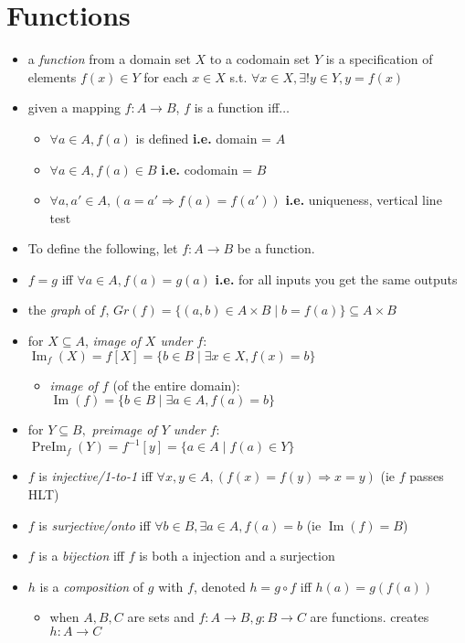 \documentclass[11pt]{article}
\theoremstyle{definition}
\newcommand{\addsection}[1]{\addcontentsline{toc}{section}{#1}\section*{#1}}
\DeclareMathOperator{\Img}{Im}
\DeclareMathOperator{\PreIm}{PreIm}
\begin{document}
\newpage
\addsection{Functions}
\begin{itemize}
    \item a \emph{function} from a domain set $X$ to a codomain set $Y$ is a specification of elements $f(x)\in Y$ for each $x\in X$ s.t. $\forall x\in X, \exists ! y\in Y, y= f(x)$
    \item given a mapping $f : A \rightarrow B$, $f$ is a function iff$\dots$
    \begin{itemize}
        \item $\forall a\in A, f(a)$ is defined \textbf{i.e.} domain = $A$
        \item $\forall a\in A, f(a) \in B$ \textbf{i.e.} codomain = $B$
        \item $\forall a, a' \in A, (a=a' \Rightarrow f(a)=f(a'))$ \textbf{i.e.} uniqueness, vertical line test
    \end{itemize}
    \item To define the following, let $f:A\rightarrow B$ be a function.
    \item $f=g$ iff $\forall a\in A, f(a) = g(a)$ \textbf{i.e.} for all inputs you get the same outputs
    \item the \emph{graph} of $f$, $Gr(f) = \{(a,b)\in A\times B\mid b = f(a)\} \subseteq A\times B$
    \item for $X\subseteq A$, \emph{image of $X$ under $f$}: $\Img_f(X) = f[X] = \{b\in B\mid \exists x\in X, f(x) = b\}$ 
    \begin{itemize}
        \item \emph{image of $f$} (of the entire domain): $\Img(f) = \{b\in B\mid\exists a\in A,f(a)=b\}$
    \end{itemize}
    \item for $Y\subseteq B,$ \emph{preimage of $Y$ under $f$}: $\PreIm_f(Y) = f^{-1}[y] = \{a\in A\mid f(a)\in Y\}$
    \item $f$ is \emph{injective/1-to-1} iff $\forall x,y\in A,(f(x) = f(y) \Rightarrow x=y)$ (ie $f$ passes HLT)
    \item $f$ is \emph{surjective/onto} iff $\forall b\in B, \exists a\in A, f(a)=b$ (ie $\Img(f)=B$)
    \item $f$ is a \emph{bijection} iff $f$ is both a injection and a surjection
    \item $h$ is a \emph{composition} of $g$ with $f$, denoted $h= g\circ f$ iff $h(a) = g(f(a))$
    \begin{itemize}
        \item when $A,B,C$ are sets and $f: A\rightarrow B, g:B\rightarrow C$ are functions. creates $h:A\rightarrow C$

\end{itemize}
\end{itemize}
\end{document}
